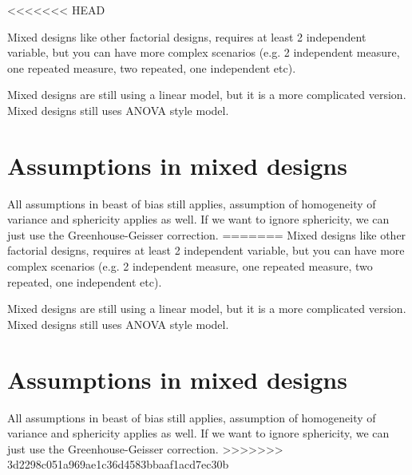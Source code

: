 <<<<<<< HEAD

Mixed designs like other factorial designs, requires at least 2 independent variable, but you can have more complex scenarios (e.g. 2 independent measure, one repeated measure, two repeated, one independent etc).

Mixed designs are still using a linear model, but it is a more complicated version. 
Mixed designs still uses ANOVA style model. 

\section{Assumptions in mixed designs}
All assumptions in beast of bias still applies, assumption of homogeneity of variance and sphericity applies as well. If we want to ignore sphericity, we can just use the Greenhouse-Geisser correction. 
=======
Mixed designs like other factorial designs, requires at least 2 independent variable, but you can have more complex scenarios (e.g. 2 independent measure, one repeated measure, two repeated, one independent etc).

Mixed designs are still using a linear model, but it is a more complicated version. 
Mixed designs still uses ANOVA style model. 

\section{Assumptions in mixed designs}
All assumptions in beast of bias still applies, assumption of homogeneity of variance and sphericity applies as well. If we want to ignore sphericity, we can just use the Greenhouse-Geisser correction. 
>>>>>>> 3d2298c051a969ae1c36d4583bbaaf1acd7ec30b
